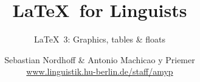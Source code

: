 


\title{
	\LaTeX\ for Linguists
}

\subtitle{\LaTeX\ 3: Graphics, tables \& floats}

\author[aMyP]{
	{\small Sebastian Nordhoff \& Antonio Machicao y Priemer}
	\\
	{\footnotesize \url{www.linguistik.hu-berlin.de/staff/amyp}}
}








\begin{frame}
  \HUtitle
\end{frame}





\nocite{Freitag&MyP15a}
\nocite{Knuth1986}
\nocite{Kopka94a}
\nocite{Nordhoff&Co}
	


%
%
%
%
%


